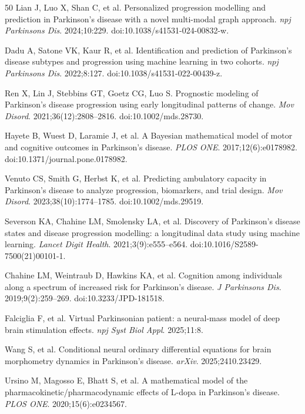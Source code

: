 \documentclass[11pt,a4paper]{article}
\begin{document}
\begin{thebibliography}{50}
Lian J, Luo X, Shan C, et al.
Personalized progression modelling and prediction in Parkinson's disease with a novel multi-modal graph approach.
\textit{npj Parkinsons Dis}. 2024;10:229.
doi:10.1038/s41531-024-00832-w.

Dadu A, Satone VK, Kaur R, et al.
Identification and prediction of Parkinson's disease subtypes and progression using machine learning in two cohorts.
\textit{npj Parkinsons Dis}. 2022;8:127.
doi:10.1038/s41531-022-00439-z.

Ren X, Lin J, Stebbins GT, Goetz CG, Luo S.
Prognostic modeling of Parkinson's disease progression using early longitudinal patterns of change.
\textit{Mov Disord}. 2021;36(12):2808--2816.
doi:10.1002/mds.28730.

Hayete B, Wuest D, Laramie J, et al.
A Bayesian mathematical model of motor and cognitive outcomes in Parkinson's disease.
\textit{PLOS ONE}. 2017;12(6):e0178982.
doi:10.1371/journal.pone.0178982.

Venuto CS, Smith G, Herbst K, et al.
Predicting ambulatory capacity in Parkinson's disease to analyze progression, biomarkers, and trial design.
\textit{Mov Disord}. 2023;38(10):1774--1785.
doi:10.1002/mds.29519.

Severson KA, Chahine LM, Smolensky LA, et al.
Discovery of Parkinson's disease states and disease progression modelling: a longitudinal data study using machine learning.
\textit{Lancet Digit Health}. 2021;3(9):e555--e564.
doi:10.1016/S2589-7500(21)00101-1.

Chahine LM, Weintraub D, Hawkins KA, et al.
Cognition among individuals along a spectrum of increased risk for Parkinson's disease.
\textit{J Parkinsons Dis}. 2019;9(2):259--269.
doi:10.3233/JPD-181518.

Falciglia F, et al.
Virtual Parkinsonian patient: a neural-mass model of deep brain stimulation effects.
\textit{npj Syst Biol Appl}. 2025;11:8.

Wang S, et al.
Conditional neural ordinary differential equations for brain morphometry dynamics in Parkinson's disease.
\textit{arXiv}. 2025;2410.23429.

Ursino M, Magosso E, Bhatt S, et al.
A mathematical model of the pharmacokinetic/pharmacodynamic effects of L-dopa in Parkinson's disease.
\textit{PLOS ONE}. 2020;15(6):e0234567.


\end{thebibliography}
\end{document}
